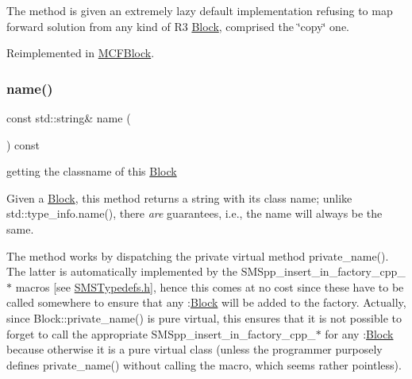 The method is given an extremely lazy default implementation refusing to map forward solution from any kind of R3 \mbox{\hyperlink{class_s_m_spp__di__unipi__it_1_1_block}{Block}}, comprised the \char`\"{}copy\char`\"{} one. 

Reimplemented in \mbox{\hyperlink{class_s_m_spp__di__unipi__it_1_1_m_c_f_block_af990663a09f7203179f903e91c6bb3f1}{M\+C\+F\+Block}}.

\mbox{\label{class_s_m_spp__di__unipi__it_1_1_block_a738e9dfd6e00507da219e4bd5a3f6be9}} 
\subsubsection{\texorpdfstring{name()}{name()}}
{\footnotesize\ttfamily const std\+::string\& name (\begin{DoxyParamCaption}\item[{void}]{ }\end{DoxyParamCaption}) const\hspace{0.3cm}{\ttfamily [inline]}}



getting the classname of this \mbox{\hyperlink{class_s_m_spp__di__unipi__it_1_1_block}{Block}} 

Given a \mbox{\hyperlink{class_s_m_spp__di__unipi__it_1_1_block}{Block}}, this method returns a string with its class name; unlike std\+::type\+\_\+info.\+name(), there {\itshape are} guarantees, i.\+e., the name will always be the same.

The method works by dispatching the private virtual method private\+\_\+name(). The latter is automatically implemented by the S\+M\+Spp\+\_\+insert\+\_\+in\+\_\+factory\+\_\+cpp\+\_\+$\ast$ macros \mbox{[}see \mbox{\hyperlink{_s_m_s_typedefs_8h}{S\+M\+S\+Typedefs.\+h}}\mbox{]}, hence this comes at no cost since these have to be called somewhere to ensure that any \+:\mbox{\hyperlink{class_s_m_spp__di__unipi__it_1_1_block}{Block}} will be added to the factory. Actually, since Block\+::private\+\_\+name() is pure virtual, this ensures that it is not possible to forget to call the appropriate S\+M\+Spp\+\_\+insert\+\_\+in\+\_\+factory\+\_\+cpp\+\_\+$\ast$ for any \+:\mbox{\hyperlink{class_s_m_spp__di__unipi__it_1_1_block}{Block}} because otherwise it is a pure virtual class (unless the programmer purposely defines private\+\_\+name() without calling the macro, which seems rather pointless). \mbox{\label{class_s_m_spp__di__unipi__it_1_1_block_ae8c20577eae73143d71b37b1550c1e93}} 
